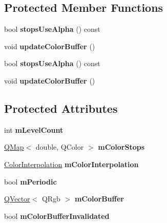 \subsection*{Protected Member Functions}
\begin{DoxyCompactItemize}
\item 
\mbox{\label{class_q_c_p_color_gradient_a137b368ea8829a871974add6e4883c71}} 
bool {\bfseries stops\+Use\+Alpha} () const
\item 
\mbox{\label{class_q_c_p_color_gradient_a353f15ab3ab586eebf1f6b58c3e2707b}} 
void {\bfseries update\+Color\+Buffer} ()
\item 
\mbox{\label{class_q_c_p_color_gradient_a137b368ea8829a871974add6e4883c71}} 
bool {\bfseries stops\+Use\+Alpha} () const
\item 
\mbox{\label{class_q_c_p_color_gradient_a353f15ab3ab586eebf1f6b58c3e2707b}} 
void {\bfseries update\+Color\+Buffer} ()
\end{DoxyCompactItemize}
\subsection*{Protected Attributes}
\begin{DoxyCompactItemize}
\item 
\mbox{\label{class_q_c_p_color_gradient_a98fb68e359904b2c991fcae3e38a211a}} 
int {\bfseries m\+Level\+Count}
\item 
\mbox{\label{class_q_c_p_color_gradient_a9208f022592e3bc77241669b66422b6f}} 
\hyperlink{class_q_map}{Q\+Map}$<$ double, Q\+Color $>$ {\bfseries m\+Color\+Stops}
\item 
\mbox{\label{class_q_c_p_color_gradient_a028cef73d863800a9ee93ffd641cce01}} 
\hyperlink{class_q_c_p_color_gradient_ac5dca17cc24336e6ca176610e7f77fc1}{Color\+Interpolation} {\bfseries m\+Color\+Interpolation}
\item 
\mbox{\label{class_q_c_p_color_gradient_a4b07deeb20ca1ee2d5ea7e01bf0420af}} 
bool {\bfseries m\+Periodic}
\item 
\mbox{\label{class_q_c_p_color_gradient_ad554625b4812f46679b180a5a2ea93fd}} 
\hyperlink{class_q_vector}{Q\+Vector}$<$ Q\+Rgb $>$ {\bfseries m\+Color\+Buffer}
\item 
\mbox{\label{class_q_c_p_color_gradient_abacf55e11f67d6722a687af1bb2687bd}} 
bool {\bfseries m\+Color\+Buffer\+Invalidated}
\end{DoxyCompactItemize}



